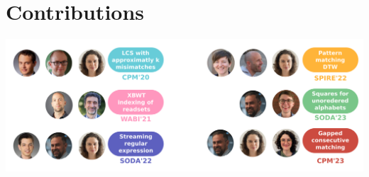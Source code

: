 \documentclass[aspectratio=169]{beamer}
\begin{document}
\section{Contributions}
\begin{frame}[plain]
  \vspace{1cm}

  \includegraphics[width=\textwidth]{pictures/mindmap/co_auth.png}
\end{frame}
\end{document}

